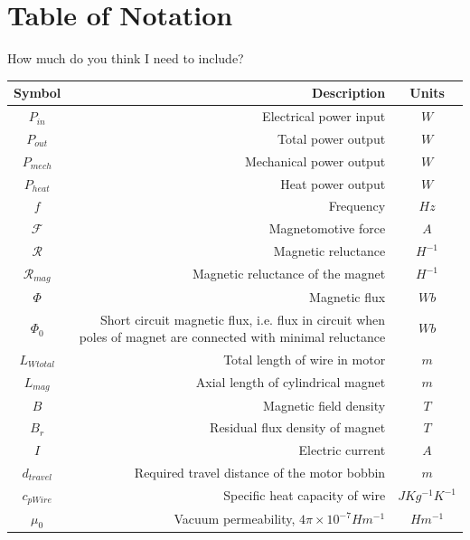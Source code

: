 \documentclass[a4paper,12pt]{article}
\begin{document}
\section*{Table of Notation}
How much do you think I need to include?
\begin{center}
    \begin{tabular}{c | D | c}
        \hline
        \textbf{Symbol} & \textbf{Description} & \textbf{Units} \\ [0.5ex]
        \hline\hline
        $P_{in}$ & Electrical power input & $W$ \\
        \hline
        $P_{out}$ & Total power output & $W$ \\
        \hline
        $P_{mech}$ & Mechanical power output & $W$ \\
        \hline
        $P_{heat}$ & Heat power output & $W$ \\
        \hline
        $f$ & Frequency & $Hz$ \\
        \hline
        $\mathcal{F}$ & Magnetomotive force & $A$ \\
        \hline
        $\mathcal{R}$ & Magnetic reluctance & $H^{-1}$ \\
        \hline
        $\mathcal{R}_{mag}$ & Magnetic reluctance of the magnet & $H^{-1}$ \\
        \hline
        $\Phi$ & Magnetic flux & $Wb$ \\
        \hline
        $\Phi_0$ & Short circuit magnetic flux, i.e. flux in circuit when poles of magnet are connected with minimal reluctance & $Wb$ \\
        \hline
        $L_{Wtotal}$ & Total length of wire in motor & $m$ \\
        \hline
        $L_{mag}$ & Axial length of cylindrical magnet & $m$ \\
        \hline
        $B$ & Magnetic field density & $T$ \\
        \hline
        $B_{r}$ & Residual flux density of magnet & $T$ \\
        \hline
        $I$ & Electric current & $A$ \\
        \hline
        $d_{travel}$ & Required travel distance of the motor bobbin & $m$ \\
        \hline
        $c_{pWire}$ & Specific heat capacity of wire & $JKg^{-1}K^{-1}$ \\
        \hline
        $\mu_0$ & Vacuum permeability, $4\pi\times10^{-7} Hm^{-1}$ \cite{engineeringtoolboxPermeability2016} & $Hm^{-1}$ \\

\end{tabular}
\end{center}
\end{document}
